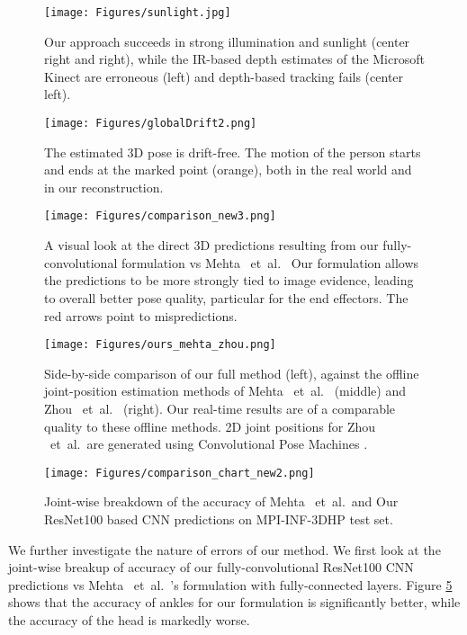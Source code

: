 \documentclass[acmtog]{acmart}
\newcommand{\etal}{~et~al.\ }
\begin{document}
\begin{figure}[]
\center
\texttt{[image: Figures/sunlight.jpg]}
\caption{Our approach succeeds in strong illumination and sunlight (center right and right), while the IR-based depth estimates of the Microsoft Kinect are erroneous (left) and depth-based tracking fails (center left).}
\label{fig:livingroom_illuminated}
\end{figure}

\begin{figure}[]
\center
\texttt{[image: Figures/globalDrift2.png]}
\caption{The estimated 3D pose is drift-free. The motion of the person starts and ends at the marked point (orange), both in the real world and in our reconstruction.}
\label{fig:driftFree}
\end{figure}
\begin{figure}
\centering\texttt{[image: Figures/comparison\_new3.png]}
  \caption{A visual look at the direct 3D predictions resulting from our fully-convolutional formulation vs Mehta \etal
          Our formulation allows the predictions to be more strongly tied to image evidence, leading to overall better pose quality, particular for the end effectors.  The red arrows point to mispredictions.}
  \label{fig:comparison}
\end{figure}
\begin{figure}
\center
\texttt{[image: Figures/ours\_mehta\_zhou.png]}
\caption{Side-by-side comparison of our full method (left), against the offline joint-position estimation methods of Mehta \etal {} (middle) and Zhou \etal {} (right). Our real-time results are of a comparable quality to these offline methods. 2D joint positions for Zhou \etal are generated using Convolutional Pose Machines .}
\label{fig:ours_mehta_zhou}
\end{figure}
\begin{figure}[t!]
  	\centering\texttt{[image: Figures/comparison\_chart\_new2.png]}
	\caption{Joint-wise breakdown of the accuracy of Mehta \etal and Our ResNet100 based CNN predictions on MPI-INF-3DHP test set.}
	\label{fig:comparison_chart}
\end{figure}
We further investigate the nature of errors of our method. We first look at the joint-wise breakup of accuracy of our fully-convolutional ResNet100 CNN predictions vs Mehta \etal's formulation with fully-connected layers. Figure \ref{fig:comparison_chart} shows that the accuracy of ankles for our formulation is significantly better, while the accuracy of the head is markedly worse. 
\end{document}
